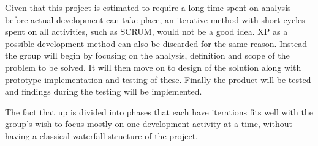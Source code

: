 Given that this project is estimated to require a long time spent on analysis before actual development can take place, an iterative method with short cycles spent on all activities, such as SCRUM, would not be a good idea. XP as a possible development method can also be discarded for the same reason. Instead the group will begin by focusing on the analysis, definition and scope of the problem to be solved. It will then move on to design of the solution along with prototype implementation and testing of these. Finally the product will be tested and findings during the testing will be implemented. 

The fact that \ac{up} is divided into phases that each have iterations fits well with the group's wish to focus mostly on one development activity at a time, without having a classical waterfall structure of the project.